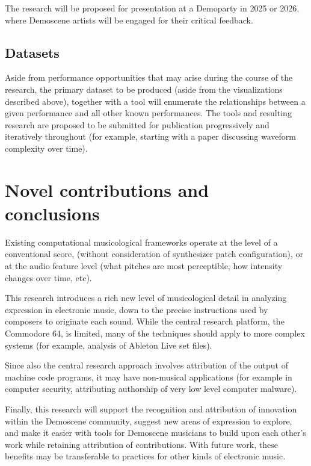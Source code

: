 \documentclass[10pt]{article}
\begin{document}
\begin{multicols*}{2}
  The research will be proposed for presentation at a Demoparty in 2025 or 2026, where Demoscene artists will be engaged for their critical feedback.

  \subsection{Datasets}

Aside from performance opportunities that may arise during the course of the research, the primary dataset to be produced (aside from the visualizations described above), together with a tool will enumerate the relationships between a given performance and all other known performances.	The tools and resulting research are proposed to be submitted for publication progressively and iteratively throughout (for example, starting with a paper discussing waveform complexity over time).

\section{Novel contributions and conclusions}

Existing computational musicological frameworks operate at the level of a conventional score, (without consideration of synthesizer patch configuration), or at the audio feature level (what pitches are most perceptible, how intensity changes over time, etc).

This research introduces a rich new level of musicological detail in analyzing expression in electronic music, down to the precise instructions used by composers to originate each sound. While the central research platform, the Commodore 64, is limited, many of the techniques should apply to more complex systems (for example, analysis of Ableton Live set files).

Since also the central research approach involves attribution of the output of machine code programs, it may have non-musical applications (for example in computer security, attributing authorship of very low level computer malware).

Finally, this research will support the recognition and attribution of innovation within the Demoscene community, suggest new areas of expression to explore, and make it easier with tools for Demoscene musicians to build upon each other’s work while retaining attribution of contributions. With future work, these benefits may be transferable to practices for other kinds of electronic music.




\end{multicols*}

\nocite{*}


\end{document}
